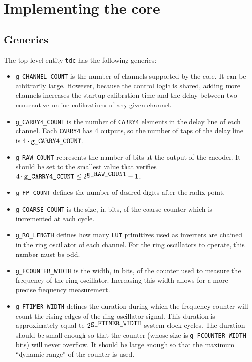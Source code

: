 \documentclass[a4paper,11pt]{article}
\begin{document}
\section{Implementing the core}
\subsection{Generics}
\label{topgenerics}
The top-level entity \verb!tdc! has the following generics:
\begin{itemize}
\item \verb!g_CHANNEL_COUNT! is the number of channels supported by the core. It can be arbitrarily large. However, because the control logic is shared, adding more channels increases the startup calibration time and the delay between two consecutive online calibrations of any given channel.
\item \verb!g_CARRY4_COUNT! is the number of \verb!CARRY4! elements in the delay line of each channel. Each \verb!CARRY4! has 4 outputs, so the number of taps of the delay line is $4 \cdot \verb!g_CARRY4_COUNT!$.
\item \verb!g_RAW_COUNT! represents the number of bits at the output of the encoder. It should be set to the smallest value that verifies $4\cdot \verb!g_CARRY4_COUNT! \le 2^{\verb!g_RAW_COUNT!}-1$.
\item \verb!g_FP_COUNT! defines the number of desired digits after the radix point.
\item \verb!g_COARSE_COUNT! is the size, in bits, of the coarse counter which is incremented at each cycle.
\item \verb!g_RO_LENGTH! defines how many \verb!LUT! primitives used as inverters are chained in the ring oscillator of each channel. For the ring oscillators to operate, this number must be odd.
\item \verb!g_FCOUNTER_WIDTH! is the width, in bits, of the counter used to measure the frequency of the ring oscillator. Increasing this width allows for a more precise frequency measurement.
\item \verb!g_FTIMER_WIDTH! defines the duration during which the frequency counter will count the rising edges of the ring oscillator signal. This duration is approximately equal to $2^{\verb!g_FTIMER_WIDTH!}$ system clock cycles. The duration should be small enough so that the counter (whose size is \verb!g_FCOUNTER_WIDTH! bits) will never overflow. It should be large enough so that the maximum ``dynamic range'' of the counter is used.
\end{itemize}
\end{document}
